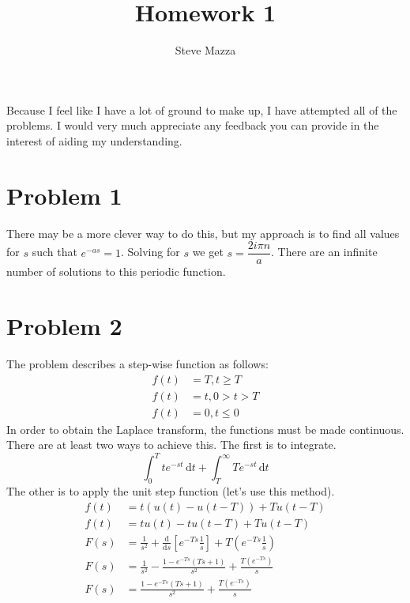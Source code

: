 \documentclass[letterpaper,10pt]{article}
\title{Homework 1}
\author{Steve Mazza}
\begin{document}
\maketitle

Because I feel like I have a lot of ground to make up, I have attempted all of the problems.  I would very much appreciate any feedback you can provide in the interest of aiding my understanding.

\section*{Problem 1}
There may be a more clever way to do this, but my approach is to find all values for $s$ such that $e^{-as}=1$.  Solving for $s$ we get $s=\dfrac{2i\pi n}{a}$.  There are an infinite number of solutions to this periodic function.

\section*{Problem 2}
The problem describes a step-wise function as follows:
\begin{align}
	f(t) &= T, t\geq T \\
	f(t) &= t, 0 > t > T \\
	f(t) &= 0, t\leq 0
\end{align}
In order to obtain the Laplace transform, the functions must be made continuous.  There are at least two ways to achieve this.  The first is to integrate.
\begin{equation}
	\int_0^T te^{-st} \, \mathrm{d} t + \int_{T}^{\infty} Te^{-st}\, \mathrm{d}t
\end{equation}
The other is to apply the unit step function (let's use this method).
\begin{align}
	f(t) &= t(u(t)-u(t-T))+Tu(t-T) \\
	f(t) &= tu(t)-tu(t-T)+Tu(t-T) \\
	F(s) &= \frac{1}{s^{2}} + \frac{\mathrm{d}}{\mathrm{d}s}\left[e^{-Ts}\frac{1}{s}\right] + T\left(e^{-Ts}\frac{1}{s}\right) \\
	F(s) &= \frac{1}{s^{2}} - \frac{1 - e^{-Ts}\left(Ts+1\right)}{s^{2}} + \frac{T\left(e^{-Ts}\right)}{s} \\
	F(s) &= \frac{1-e^{-Ts}\left(Ts+1\right)}{s^{2}} + \frac{T\left(e^{-Ts}\right)}{s}
\end{align}
\end{document}

